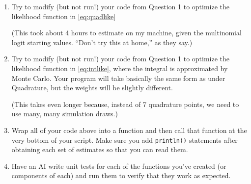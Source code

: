 \documentclass[12pt,english]{article}
\begin{document}
\begin{enumerate}
\item Try to modify (but not run!) your code from Question 1 to optimize the likelihood function in \eqref{eq:quadlike}

(This took about 4 hours to estimate on my machine, given the multinomial logit starting values. ``Don't try this at home,'' as they say.)

\item Try to modify (but not run!) your code from Question 1 to optimize the likelihood function in \eqref{eq:intlike}, where the integral is approximated by Monte Carlo. Your program will take basically the same form as under Quadrature, but the weights will be slightly different.

(This takes even longer because, instead of 7 quadrature points, we need to use many, many simulation draws.)

\item Wrap all of your code above into a function and then call that function at the very bottom of your script. Make sure you add \texttt{println()} statements after obtaining each set of estimates so that you can read them.

\item Have an AI write unit tests for each of the functions you've created (or components of each) and run them to verify that they work as expected.
\end{enumerate}
\end{document}
